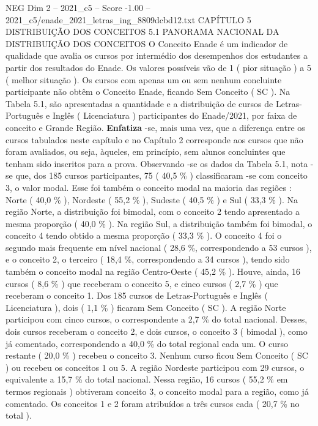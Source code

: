 \begin{textsample}{NEG Dim 2 – 2021\_c5 – Score -1.00 – 2021\_c5/enade\_2021\_letras\_ing\_8809dcbd12.txt}  \label{ex:f2_neg_148}
CAPÍTULO 5 DISTRIBUIÇÃO DOS CONCEITOS 5.1 PANORAMA NACIONAL DA DISTRIBUIÇÃO DOS CONCEITOS O Conceito Enade é um indicador de qualidade que avalia os cursos por intermédio dos desempenhos dos estudantes a partir dos resultados do Enade.
Os valores possíveis vão de 1 ( pior situação ) a 5 ( melhor situação ).
Os cursos com apenas um ou sem nenhum concluinte participante não obtêm o Conceito Enade, ficando Sem Conceito ( SC ).
Na Tabela 5.1, são apresentadas a quantidade e a distribuição de cursos de Letras-Português e Inglês ( Licenciatura ) participantes do Enade/2021, por faixa de conceito e Grande Região. \textbf{Enfatiza} -se, mais uma vez, que a diferença entre os cursos tabulados neste capítulo e no Capítulo 2 corresponde aos cursos que não foram avaliados, ou seja, àqueles, em princípio, sem alunos concluintes que tenham sido inscritos para a prova.
Observando -se os dados da Tabela 5.1, nota -se que, dos 185 cursos participantes, 75 ( 40,5 \% ) classificaram -se com conceito 3, o valor modal.
Esse foi também o conceito modal na maioria das regiões : Norte ( 40,0 \% ), Nordeste ( 55,2 \% ), Sudeste ( 40,5 \% ) e Sul ( 33,3 \% ).
Na região Norte, a distribuição foi bimodal, com o conceito 2 tendo apresentado a mesma proporção ( 40,0 \% ).
Na região Sul, a distribuição também foi bimodal, o conceito 4 tendo obtido a mesma proporção ( 33,3 \% ).
O conceito 4 foi o segundo mais frequente em nível nacional ( 28,6 \%, correspondendo a 53 cursos ), e o conceito 2, o terceiro ( 18,4 \%, correspondendo a 34 cursos ), tendo sido também o conceito modal na região Centro-Oeste ( 45,2 \% ).
Houve, ainda, 16 cursos ( 8,6 \% ) que receberam o conceito 5, e cinco cursos ( 2,7 \% ) que receberam o conceito 1.
Dos 185 cursos de Letras-Português e Inglês ( Licenciatura ), dois ( 1,1 \% ) ficaram Sem Conceito ( SC ).
A região Norte participou com cinco cursos, o correspondente a 2,7 \% do total nacional.
Desses, dois cursos receberam o conceito 2, e dois cursos, o conceito 3 ( bimodal ), como já comentado, correspondendo a 40,0 \% do total regional cada um.
O curso restante ( 20,0 \% ) recebeu o conceito 3.
Nenhum curso ficou Sem Conceito ( SC ) ou recebeu os conceitos 1 ou 5.
A região Nordeste participou com 29 cursos, o equivalente a 15,7 \% do total nacional.
Nessa região, 16 cursos ( 55,2 \% em termos regionais ) obtiveram conceito 3, o conceito modal para a região, como já comentado.
Os conceitos 1 e 2 foram atribuídos a três cursos cada ( 20,7 \% no total ).

\end{textsample}
